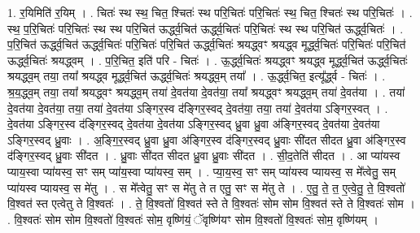 \documentclass[17pt]{extarticle}
\begin{document}
1. र॒यिमिति॑ र॒यिम् । . चितः॑ स्थ स्थ॒ चित॒ श्चितः॑ स्थ परि॒चितः॑ परि॒चितः॑ स्थ॒ चित॒ श्चितः॑ स्थ परि॒चितः॑ । . स्थ॒ प॒रि॒चितः॑ परि॒चितः॑ स्थ स्थ परि॒चित॑ ऊर्द्ध्व॒चित॑ ऊर्द्ध्व॒चितः॑ परि॒चितः॑ स्थ स्थ परि॒चित॑ ऊर्द्ध्व॒चितः॑ । . प॒रि॒चित॑ ऊर्द्ध्व॒चित॑ ऊर्द्ध्व॒चितः॑ परि॒चितः॑ परि॒चित॑ ऊर्द्ध्व॒चितः॑ श्रयद्ध्वꣳ श्रयद्ध्व मूर्द्ध्व॒चितः॑ परि॒चितः॑ परि॒चित॑ ऊर्द्ध्व॒चितः॑ श्रयद्ध्वम् । . प॒रि॒चित॒ इति॑ परि - चितः॑ । . ऊ॒र्द्ध्व॒चितः॑ श्रयद्ध्वꣳ श्रयद्ध्व मूर्द्ध्व॒चित॑ ऊर्द्ध्व॒चितः॑ श्रयद्ध्व॒म् तया॒ तया᳚ श्रयद्ध्व मूर्द्ध्व॒चित॑ ऊर्द्ध्व॒चितः॑ श्रयद्ध्व॒म् तया᳚ । . ऊ॒र्द्ध्व॒चित॒ इत्यू᳚र्द्ध्व - चितः॑ । . श्र॒य॒द्ध्व॒म् तया॒ तया᳚ श्रयद्ध्वꣳ श्रयद्ध्व॒म् तया॑ दे॒वत॑या दे॒वत॑या॒ तया᳚ श्रयद्ध्वꣳ श्रयद्ध्व॒म् तया॑ दे॒वत॑या । . तया॑ दे॒वत॑या दे॒वत॑या॒ तया॒ तया॑ दे॒वत॑या ऽङ्गिर॒स्व द॑ङ्गिर॒स्वद् दे॒वत॑या॒ तया॒ तया॑ दे॒वत॑या ऽङ्गिर॒स्वत् । . दे॒वत॑या ऽङ्गिर॒स्व द॑ङ्गिर॒स्वद् दे॒वत॑या दे॒वत॑या ऽङ्गिर॒स्वद् ध्रु॒वा ध्रु॒वा अ॑ङ्गिर॒स्वद् दे॒वत॑या दे॒वत॑या ऽङ्गिर॒स्वद् ध्रु॒वाः । . अ॒ङ्गि॒र॒स्वद् ध्रु॒वा ध्रु॒वा अ॑ङ्गिर॒स्व द॑ङ्गिर॒स्वद् ध्रु॒वाः सी॑दत सीदत ध्रु॒वा अ॑ङ्गिर॒स्व द॑ङ्गिर॒स्वद् ध्रु॒वाः सी॑दत । . ध्रु॒वाः सी॑दत सीदत ध्रु॒वा ध्रु॒वाः सी॑दत । . सी॒द॒तेति॑ सीदत । . आ प्या॑यस्व प्याय॒स्वा प्या॑यस्व॒ सꣳ सम् प्या॑य॒स्वा प्या॑यस्व॒ सम् । . प्या॒य॒स्व॒ सꣳ सम् प्या॑यस्व प्यायस्व॒ स मे᳚त्वेतु॒ सम् प्या॑यस्व प्यायस्व॒ स मे॑तु । . स मे᳚त्वेतु॒ सꣳ स मे॑तु ते त एतु॒ सꣳ स मे॑तु ते । . ए॒तु॒ ते॒ त॒ ए॒त्वे॒तु॒ ते॒ वि॒श्वतो॑ वि॒श्वत॑ स्त एत्वेतु ते वि॒श्वतः॑ । . ते॒ वि॒श्वतो॑ वि॒श्वत॑ स्ते ते वि॒श्वतः॑ सोम सोम वि॒श्वत॑ स्ते ते वि॒श्वतः॑ सोम । . वि॒श्वतः॑ सोम सोम वि॒श्वतो॑ वि॒श्वतः॑ सोम॒ वृष्णि॑यं॒ ॅवृष्णि॑यꣳ सोम वि॒श्वतो॑ वि॒श्वतः॑ सोम॒ वृष्णि॑यम् । \newline
\end{document}
